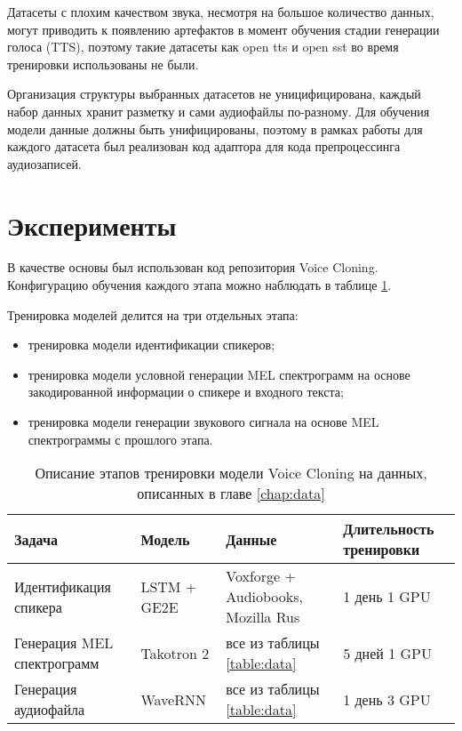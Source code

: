 \documentclass[oneside,final,14pt]{extreport}
\begin{document}
Датасеты с плохим качеством звука, несмотря на большое количество данных, могут приводить к появлению артефактов в момент обучения стадии генерации голоса (TTS), поэтому такие датасеты как open tts и open sst \cite{bib:open_tts} во время тренировки использованы не были. 

Организация структуры выбранных датасетов не уницифицирована, каждый набор данных хранит разметку и сами аудиофайлы по-разному. Для обучения модели данные должны быть унифицированы, поэтому в рамках работы для каждого датасета был реализован код адаптора для кода препроцессинга аудиозаписей.

\section{Эксперименты}
В качестве основы был использован код репозитория Voice Cloning\cite{bib:voice_cloning}. Конфигурацию обучения каждого этапа можно наблюдать в таблице \ref{table:experiments}.

\iffalse
Автор модели получил веса только на аудиозаписях англоговорящих спикеров, поэтому в качестве начального эксперимента была произведена попытка воспроизвести результаты англоязычной модели на русскоязычных датасетах без изменения архетектур входящих в нее моделей и гиперпарамметров и расписания тренировки. 
\fi

Тренировка моделей делится на три отдельных этапа:
\begin{itemize}
    \item тренировка модели идентификации спикеров;
    \item тренировка модели условной генерации MEL спектрограмм на основе закодированной информации о спикере и входного текста;
    \item тренировка модели генерации звукового сигнала на основе MEL спектрограммы с прошлого этапа.
\end{itemize}



\begin{table}[H] 
\begin{tabularx}{\textwidth}{|X|X|X|X|}
\hline
Задача
&
Модель
&
Данные
&
Длительность тренировки
\\
\hline
Идентификация спикера
&
LSTM + GE2E
 &
Voxforge + Audiobooks,
Mozilla Rus
&
1 день 1 GPU
\\
\hline
Генерация MEL спектрограмм
&
Takotron 2
&
 все из таблицы \ref{table:data}
&
5 дней 1 GPU
\\
\hline
Генерация аудиофайла
&
WaveRNN
 &
 все из таблицы \ref{table:data}
&
1 день 3 GPU
\\
\hline
\end{tabularx}
\caption{Описание этапов тренировки модели Voice Cloning на данных, описанных в главе \ref{chap:data}}
\label{table:experiments}
\end{table}
  
\end{document}
